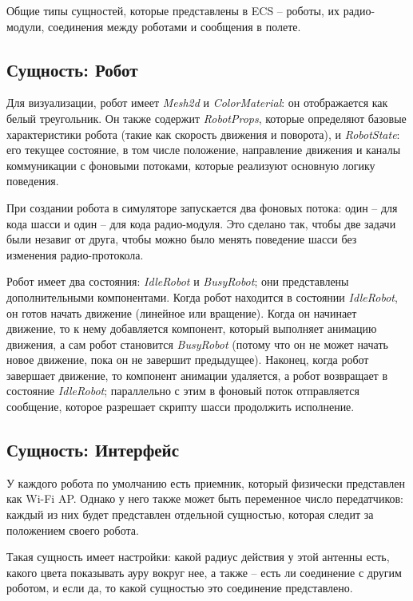 \documentclass[%
]{report}
\begin{document}
Общие типы сущностей, которые представлены в ECS -- 
роботы, их радио-модули,
соединения между роботами
и сообщения в полете.

\subsection{Сущность: Робот}

Для визуализации, робот имеет \emph{Mesh2d} и \emph{ColorMaterial}:
он отображается как белый треугольник.
Он также содержит \emph{RobotProps},
которые определяют базовые характеристики робота
(такие как скорость движения и поворота),
и \emph{RobotState}: 
его текущее состояние, в том числе
положение, направление движения
и каналы коммуникации с фоновыми потоками,
которые реализуют основную логику поведения.

При создании робота в симуляторе запускается два фоновых потока:
один -- для кода шасси
и один -- для кода радио-модуля.
Это сделано так, чтобы две задачи были незавиг от друга,
чтобы можно было менять поведение шасси без изменения радио-протокола.

Робот имеет два состояния: \emph{IdleRobot} и \emph{BusyRobot};
они представлены дополнительными компонентами.
Когда робот находится в состоянии \emph{IdleRobot},
он готов начать движение
(линейное или вращение).
Когда он начинает движение,
то к нему добавляется компонент,
который выполняет анимацию движения,
а сам робот становится \emph{BusyRobot}
(потому что он не может начать новое движение,
пока он не завершит предыдущее).
Наконец, когда робот завершает движение,
то компонент анимации удаляется,
а робот возвращает в состояние \emph{IdleRobot};
параллельно с этим
в фоновый поток отправляется сообщение,
которое разрешает скрипту шасси продолжить исполнение.

\subsection{Сущность: Интерфейс}

У каждого робота по умолчанию есть приемник,
который физически представлен как Wi-Fi AP.
Однако у него также может быть переменное число передатчиков:
каждый из них будет представлен отдельной сущностью,
которая следит за положением своего робота.

Такая сущность имеет настройки:
какой радиус действия у этой антенны есть,
какого цвета показывать ауру вокруг нее,
а также -- есть ли соединение с другим роботом,
и если да, то какой сущностью это соединение представлено.
\end{document}
